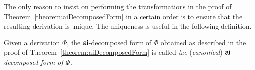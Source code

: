 \begin{remark}\label{remakr:aiDecomposedFormUnique}
The only reason to insist on performing the transformations in the proof of Theorem~\vref{theorem:aiDecomposedForm} in a certain order is to ensure that the resulting derivation is unique. The uniqueness is useful in the following definition.
\end{remark}

\begin{definition}\label{definition:TheAiDecomposedForm}
Given a derivation $\Phi$, the ${\mathsf{ai}}$-decomposed form of $\Phi$ obtained as described in the proof of Theorem~\vref{theorem:aiDecomposedForm} is called \emph{the} (\emph{canonical}) \emph{${\mathsf{ai}}$-decomposed form of\/ $\Phi$}.
\end{definition}
